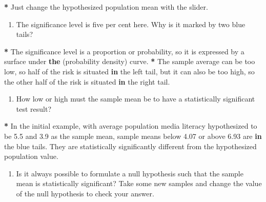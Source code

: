 \documentclass[a4paper]{book}
\newenvironment{Shaded}{\begin{snugshade}}{\end{snugshade}}
\newcommand{\KeywordTok}[1]{\textcolor[rgb]{0,0,0}{\textbf{#1}}}
\newcommand{\FloatTok}[1]{\textcolor[rgb]{0.00,0.00,0.00}{#1}}
\newcommand{\StringTok}[1]{\textcolor[rgb]{0.00,0.00,0.00}{#1}}
\newcommand{\ControlFlowTok}[1]{\textcolor[rgb]{0.00,0.00,0.00}{\textbf{#1}}}
\newcommand{\OperatorTok}[1]{\textcolor[rgb]{0.00,0.00,0.00}{\textbf{#1}}}
\newcommand{\NormalTok}[1]{#1}
\providecommand{\tightlist}{%
  \setlength{\itemsep}{0pt}\setlength{\parskip}{0pt}}
\theoremstyle{definition}
\theoremstyle{definition}
\theoremstyle{definition}
\theoremstyle{remark}
\begin{document}
\begin{Shaded}
\begin{Highlighting}[]
\OperatorTok{*}\StringTok{ }\NormalTok{Just change the hypothesized population mean with the slider.}
\end{Highlighting}
\end{Shaded}

\begin{enumerate}
\def\labelenumi{\arabic{enumi}.}
\setcounter{enumi}{2}
\tightlist
\item
  The significance level is five per cent here. Why is it marked by two
  blue tails?
\end{enumerate}

\begin{Shaded}
\begin{Highlighting}[]
\OperatorTok{*}\StringTok{ }\NormalTok{The significance level is a proportion or probability, so it is expressed by}
\NormalTok{a surface under }\KeywordTok{the}\NormalTok{ (probability density) curve.}
\OperatorTok{*}\StringTok{ }\NormalTok{The sample average can be too low, so half of the risk is situated }\ControlFlowTok{in}\NormalTok{ the}
\NormalTok{left tail, but it can also be too high, so the other half of the risk is}
\NormalTok{situated }\ControlFlowTok{in}\NormalTok{ the right tail.}
\end{Highlighting}
\end{Shaded}

\begin{enumerate}
\def\labelenumi{\arabic{enumi}.}
\setcounter{enumi}{3}
\tightlist
\item
  How low or high must the sample mean be to have a statistically
  significant test result?
\end{enumerate}

\begin{Shaded}
\begin{Highlighting}[]
\OperatorTok{*}\StringTok{ }\NormalTok{In the initial example, with average population media literacy hypothesized}
\NormalTok{to be }\FloatTok{5.5}\NormalTok{ and }\FloatTok{3.9}\NormalTok{ as the sample mean, sample means below }\FloatTok{4.07}\NormalTok{ or above }\FloatTok{6.93}
\NormalTok{are }\ControlFlowTok{in}\NormalTok{ the blue tails. They are statistically significantly different from the}
\NormalTok{hypothesized population value.}
\end{Highlighting}
\end{Shaded}

\begin{enumerate}
\def\labelenumi{\arabic{enumi}.}
\setcounter{enumi}{4}
\tightlist
\item
  Is it always possible to formulate a null hypothesis such that the
  sample mean is statistically significant? Take some new samples and
  change the value of the null hypothesis to check your answer.
\end{enumerate}
\end{document}
